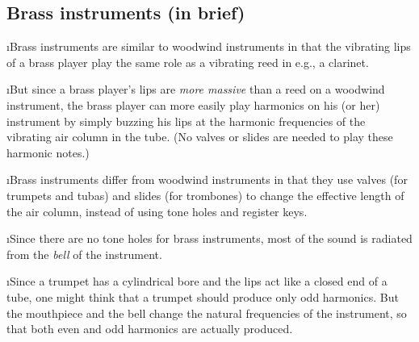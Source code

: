 \ei
\subsection{Brass instruments (in brief)}
\bi

\i Brass instruments are similar to woodwind instruments in 
that the vibrating lips of a brass player play the same role as
a vibrating reed in e.g., a clarinet.

\i But since a brass player's lips are {\em more massive} 
than a reed on a woodwind instrument, the brass player
can more easily play harmonics on his (or her) instrument
by simply buzzing his lips at the harmonic frequencies of
the vibrating air column in the tube.
(No valves or slides are needed to play these harmonic notes.)

\i Brass instruments differ from woodwind instruments in that 
they use valves (for trumpets and tubas) and slides 
(for trombones) to change the effective length of the air column, 
instead of using tone holes and register keys.

\i Since there are no tone holes for brass instruments, 
most of the sound is radiated from the {\em bell} of the instrument.

\i Since a trumpet has a cylindrical bore and the lips act like
a closed end of a tube, one might think that a trumpet should produce 
only odd harmonics.
But the mouthpiece and the bell change the natural frequencies
of the instrument, so that both even and odd harmonics are actually
produced.

\ei

